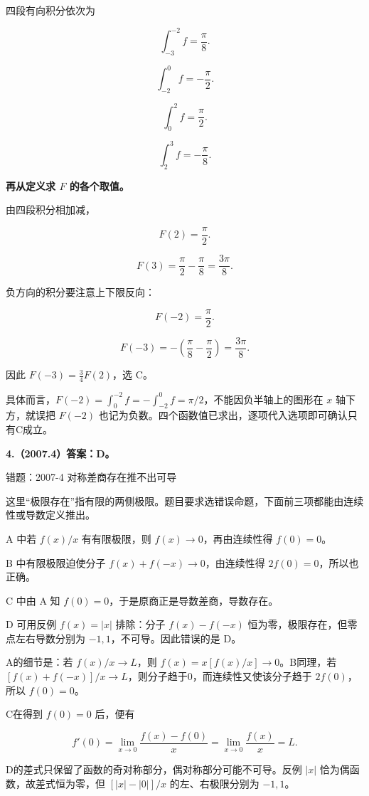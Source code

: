 \documentclass[UTF8,11pt,fontset=windows]{ctexart}
\begin{document}
四段有向积分依次为

$$
\int_{-3}^{-2}f=\frac\pi8.
$$

$$
\int_{-2}^{0}f=-\frac\pi2.
$$

$$
\int_0^2f=\frac\pi2.
$$

$$
\int_2^3f=-\frac\pi8.
$$

\textbf{再从定义求 $F$ 的各个取值。}

由四段积分相加减，

$$
F(2)=\frac\pi2.
$$

$$
F(3)=\frac\pi2-\frac\pi8=\frac{3\pi}{8}.
$$

负方向的积分要注意上下限反向：

$$
F(-2)=\frac\pi2.
$$

$$
F(-3)=-\left(\frac\pi8-\frac\pi2\right)=\frac{3\pi}{8}.
$$

因此 $F(-3)=\frac34F(2)$，选 C。

具体而言，$F(-2)=\int_0^{-2}f=-\int_{-2}^0f=\pi/2$，不能因负半轴上的图形在 $x$ 轴下方，就误把 $F(-2)$ 也记为负数。四个函数值已求出，逐项代入选项即可确认只有C成立。

\clearpage

\textbf{4.（2007.4）答案：D。}

\begingroup\color{gray}错题：2007-4 对称差商存在推不出可导\par\endgroup

这里“极限存在”指有限的两侧极限。题目要求选错误命题，下面前三项都能由连续性或导数定义推出。

A 中若 $f(x)/x$ 有有限极限，则 $f(x)\to0$，再由连续性得 $f(0)=0$。

B 中有限极限迫使分子 $f(x)+f(-x)\to0$，由连续性得 $2f(0)=0$，所以也正确。

C 中由 A 知 $f(0)=0$，于是原商正是导数差商，导数存在。

D 可用反例 $f(x)=|x|$ 排除：分子 $f(x)-f(-x)$ 恒为零，极限存在，但零点左右导数分别为 $-1,1$，不可导。因此错误的是 D。

A的细节是：若 $f(x)/x\to L$，则 $f(x)=x[f(x)/x]\to0$。B同理，若 $[f(x)+f(-x)]/x\to L$，则分子趋于0，而连续性又使该分子趋于 $2f(0)$，所以 $f(0)=0$。

C在得到 $f(0)=0$ 后，便有

$$
f'(0)=\lim_{x\to0}\frac{f(x)-f(0)}x
=\lim_{x\to0}\frac{f(x)}x=L.
$$

D的差式只保留了函数的奇对称部分，偶对称部分可能不可导。反例 $|x|$ 恰为偶函数，故差式恒为零，但 $[|x|-|0|]/x$ 的左、右极限分别为 $-1,1$。
\end{document}
